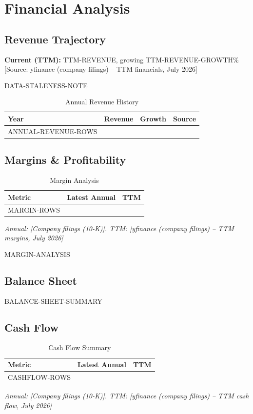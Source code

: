 \documentclass[11pt,a4paper]{report}
\newcommand{\source}[1]{\hfill\small\textit{#1}}
\begin{document}
\chapter{Financial Analysis}

\section{Revenue Trajectory}
\textbf{Current (TTM):} TTM-REVENUE, growing TTM-REVENUE-GROWTH\% [Source: yfinance (company filings) -- TTM financials, July 2026]

DATA-STALENESS-NOTE

\begin{table}[H]
\centering
\caption{Annual Revenue History}
\begin{tabularx}{\textwidth}{lC{2.5cm}C{2.5cm}X}
\toprule
\textbf{Year} & \textbf{Revenue} & \textbf{Growth} & \textbf{Source} \\
\midrule
ANNUAL-REVENUE-ROWS
\bottomrule
\end{tabularx}
\end{table}

\section{Margins \& Profitability}
\begin{table}[H]
\centering
\caption{Margin Analysis}
\begin{tabularx}{\textwidth}{lC{2.5cm}C{2.5cm}}
\toprule
\textbf{Metric} & \textbf{Latest Annual} & \textbf{TTM} \\
\midrule
MARGIN-ROWS
\bottomrule
\end{tabularx}
\source{Annual: [Company filings (10-K)]. TTM: [yfinance (company filings) -- TTM margins, July 2026]}
\end{table}

MARGIN-ANALYSIS

\section{Balance Sheet}
BALANCE-SHEET-SUMMARY

\section{Cash Flow}
\begin{table}[H]
\centering
\caption{Cash Flow Summary}
\begin{tabularx}{\textwidth}{lC{2.5cm}C{2.5cm}}
\toprule
\textbf{Metric} & \textbf{Latest Annual} & \textbf{TTM} \\
\midrule
CASHFLOW-ROWS
\bottomrule
\end{tabularx}
\source{Annual: [Company filings (10-K)]. TTM: [yfinance (company filings) -- TTM cash flow, July 2026]}
\end{table}
\end{document}
